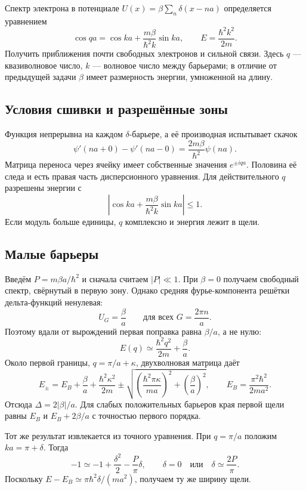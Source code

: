 \documentclass[../final.tex]{subfiles}
\begin{document}
\label{task:fksv_kronig_penney}

\condition
Спектр электрона в потенциале $U(x)=\beta\sum_n\delta(x-na)$
определяется уравнением
\[
    \cos qa=\cos ka+\frac{m\beta}{\hbar^2k}\sin ka,
    \qquad E=\frac{\hbar^2k^2}{2m}.
\]
Получить приближения почти свободных электронов и сильной связи.
Здесь $q$ --- квазиволновое число, $k$ --- волновое число между барьерами;
в отличие от предыдущей задачи $\beta$ имеет размерность энергии,
умноженной на длину.

\solution

\subsection*{Условия сшивки и разрешённые зоны}

Функция непрерывна на каждом $\delta$-барьере, а её производная
испытывает скачок
\[
    \psi'(na+0)-\psi'(na-0)=\frac{2m\beta}{\hbar^2}\psi(na).
\]
Матрица переноса через ячейку имеет собственные значения $e^{\pm iqa}$.
Половина её следа и есть правая часть дисперсионного уравнения.
Для действительного $q$ разрешены энергии с
\[
    \left|\cos ka+\frac{m\beta}{\hbar^2k}\sin ka\right|\le1.
\]
Если модуль больше единицы, $q$ комплексно и энергия лежит в щели.

\subsection*{Малые барьеры}

Введём $P=m\beta a/\hbar^2$ и сначала считаем $|P|\ll1$.
При $\beta=0$ получаем свободный спектр, свёрнутый в первую зону.
Однако средняя фурье-компонента решётки дельта-функций ненулевая:
\[
    U_G=\frac\beta a\qquad \text{для всех }G=\frac{2\pi n}{a}.
\]
Поэтому вдали от вырождений первая поправка равна $\beta/a$,
а не нулю:
\[
    E(q)\simeq\frac{\hbar^2q^2}{2m}+\frac\beta a.
\]
Около первой границы, $q=\pi/a+\kappa$, двухволновая матрица даёт
\[
    E_\pm=E_B+\frac\beta a+\frac{\hbar^2\kappa^2}{2m}
       \pm\sqrt{\left(\frac{\hbar^2\pi\kappa}{ma}\right)^2
                         +\left(\frac\beta a\right)^2},
    \qquad E_B=\frac{\pi^2\hbar^2}{2ma^2}.
\]
Отсюда $\Delta=2|\beta|/a$.
Для слабых положительных барьеров края первой щели
равны $E_B$ и $E_B+2\beta/a$ с точностью первого порядка.

Тот же результат извлекается из точного уравнения. При $q=\pi/a$
положим $ka=\pi+\delta$. Тогда
\[
    -1\simeq-1+\frac{\delta^2}{2}-\frac P\pi\delta,
    \qquad \delta=0\quad\text{или}\quad\delta\simeq\frac{2P}{\pi}.
\]
Поскольку $E-E_B\simeq\pi\hbar^2\delta/(ma^2)$,
получаем ту же ширину щели.
\end{document}
